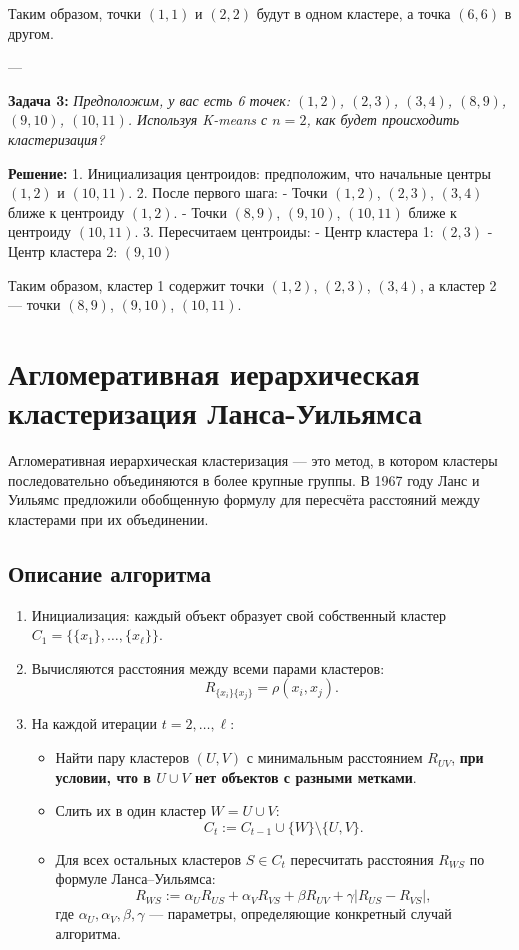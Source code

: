 Таким образом, точки $(1, 1)$ и $(2, 2)$ будут в одном кластере, а точка $(6, 6)$ в другом.

---

\textbf{Задача 3:} \textit{Предположим, у вас есть 6 точек: $(1, 2)$, $(2, 3)$, $(3, 4)$, $(8, 9)$, $(9, 10)$, $(10, 11)$. Используя K-means с $n=2$, как будет происходить кластеризация?}

\textbf{Решение:}  
1. Инициализация центроидов: предположим, что начальные центры $(1, 2)$ и $(10, 11)$.
2. После первого шага:
   - Точки $(1, 2)$, $(2, 3)$, $(3, 4)$ ближе к центроиду $(1, 2)$.
   - Точки $(8, 9)$, $(9, 10)$, $(10, 11)$ ближе к центроиду $(10, 11)$.
3. Пересчитаем центроиды:
   - Центр кластера 1: $(2, 3)$
   - Центр кластера 2: $(9, 10)$

Таким образом, кластер 1 содержит точки $(1, 2)$, $(2, 3)$, $(3, 4)$, а кластер 2 — точки $(8, 9)$, $(9, 10)$, $(10, 11)$.

\section{Агломеративная иерархическая кластеризация Ланса-Уильямса}

Агломеративная иерархическая кластеризация — это метод, в котором кластеры последовательно объединяются в более крупные группы. В 1967 году Ланс и Уильямс предложили обобщенную формулу для пересчёта расстояний между кластерами при их объединении.

\subsection{Описание алгоритма}
\begin{enumerate}
    \item Инициализация: каждый объект образует свой собственный кластер $C_1 = \{\{x_1\}, \dots, \{x_\ell\}\}$.
    \item Вычисляются расстояния между всеми парами кластеров: 
    \[
    R_{\{x_i\}\{x_j\}} = \rho(x_i, x_j).
    \]
    \item На каждой итерации $t = 2, \dots, \ell$:
    \begin{itemize}
        \item Найти пару кластеров $(U, V)$ с минимальным расстоянием $R_{UV}$, \textbf{при условии, что в $U \cup V$ нет объектов с разными метками}.
        \item Слить их в один кластер $W = U \cup V$:
        \[
        C_t := C_{t-1} \cup \{W\} \setminus \{U, V\}.
        \]
        \item Для всех остальных кластеров $S \in C_t$ пересчитать расстояния $R_{WS}$ по формуле Ланса–Уильямса:
        \[
        R_{WS} := \alpha_U R_{US} + \alpha_V R_{VS} + \beta R_{UV} + \gamma |R_{US} - R_{VS}|,
        \]
        где $\alpha_U, \alpha_V, \beta, \gamma$ — параметры, определяющие конкретный случай алгоритма.
    \end{itemize}
\end{enumerate}


